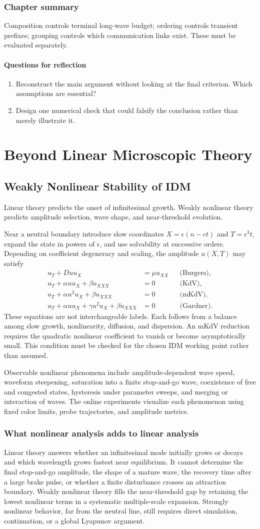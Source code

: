 \documentclass[11pt,a4paper,openany]{book}
\numberwithin{equation}{chapter}
\numberwithin{figure}{chapter}
\numberwithin{table}{chapter}
\newcommand{\chapterguide}[1]{\begin{tcolorbox}[keybox,title=Chapter guide]#1\end{tcolorbox}}
\newcommand{\chapterend}[1]{\section*{Chapter summary}\addcontentsline{toc}{section}{Chapter summary}\begin{tcolorbox}[resultbox]#1\end{tcolorbox}\subsection*{Questions for reflection}\begin{enumerate}[leftmargin=1.7em]\item Reconstruct the main argument without looking at the final criterion. Which assumptions are essential?\item Design one numerical check that could falsify the conclusion rather than merely illustrate it.\end{enumerate}\clearpage}
\begin{document}
\chapterend{Composition controls terminal long-wave budget; ordering controls transient prefixes; grouping controls which communication links exist. These must be evaluated separately.}

\part{Beyond Linear Microscopic Theory}

\chapter{Weakly Nonlinear Stability of IDM}
\chapterguide{Linear theory predicts the onset of infinitesimal growth. Weakly nonlinear theory predicts amplitude selection, wave shape, and near-threshold evolution.}

Near a neutral boundary introduce slow coordinates $X=\epsilon(n-ct)$ and $T=\epsilon^3t$, expand the state in powers of $\epsilon$, and use solvability at successive orders. Depending on coefficient degeneracy and scaling, the amplitude $u(X,T)$ may satisfy
\begin{align}
u_T+Duu_X&=\mu u_{XX} &&\text{(Burgers)},\\
u_T+\alpha uu_X+\beta u_{XXX}&=0 &&\text{(KdV)},\\
u_T+\alpha u^2u_X+\beta u_{XXX}&=0 &&\text{(mKdV)},\\
u_T+\alpha uu_X+\gamma u^2u_X+\beta u_{XXX}&=0 &&\text{(Gardner)}.
\end{align}
These equations are not interchangeable labels. Each follows from a balance among slow growth, nonlinearity, diffusion, and dispersion. An mKdV reduction requires the quadratic nonlinear coefficient to vanish or become asymptotically small. This condition must be checked for the chosen IDM working point rather than assumed.

Observable nonlinear phenomena include amplitude-dependent wave speed, waveform steepening, saturation into a finite stop-and-go wave, coexistence of free and congested states, hysteresis under parameter sweeps, and merging or interaction of waves. The online experiments visualize each phenomenon using fixed color limits, probe trajectories, and amplitude metrics.

\section{What nonlinear analysis adds to linear analysis}
Linear theory answers whether an infinitesimal mode initially grows or decays and which wavelength grows fastest near equilibrium. It cannot determine the final stop-and-go amplitude, the shape of a mature wave, the recovery time after a large brake pulse, or whether a finite disturbance crosses an attraction boundary. Weakly nonlinear theory fills the near-threshold gap by retaining the lowest nonlinear terms in a systematic multiple-scale expansion. Strongly nonlinear behavior, far from the neutral line, still requires direct simulation, continuation, or a global Lyapunov argument.
\end{document}

